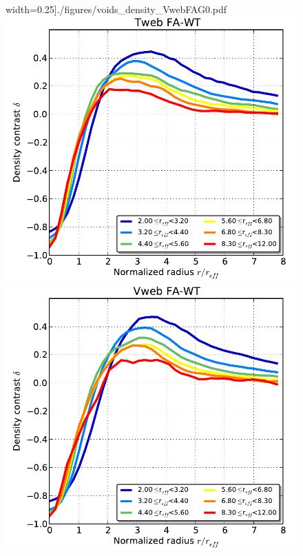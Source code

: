 \documentclass[a4,useAMS,usenatbib,usegraphicx]{latex/mn2e}
\begin{document}
\begin{flushleft}
\begin{figure}
  width=0.25\textheight]{./figures/voids_density_VwebFAG0.pdf}
  \includegraphics[trim = 1mm 2mm 4mm 0mm, clip, keepaspectratio=true,
  width=0.25\textheight]{./figures/voids_density_TwebFAG1.pdf}
  \includegraphics[trim = 1mm 2mm 4mm 0mm, clip, keepaspectratio=true,
  width=0.25\textheight]{./figures/voids_density_VwebFAG1.pdf}


  \label{fig:RhoVel}
  \vspace{0.1 cm}

\end{figure}
\end{flushleft}
\end{document}
